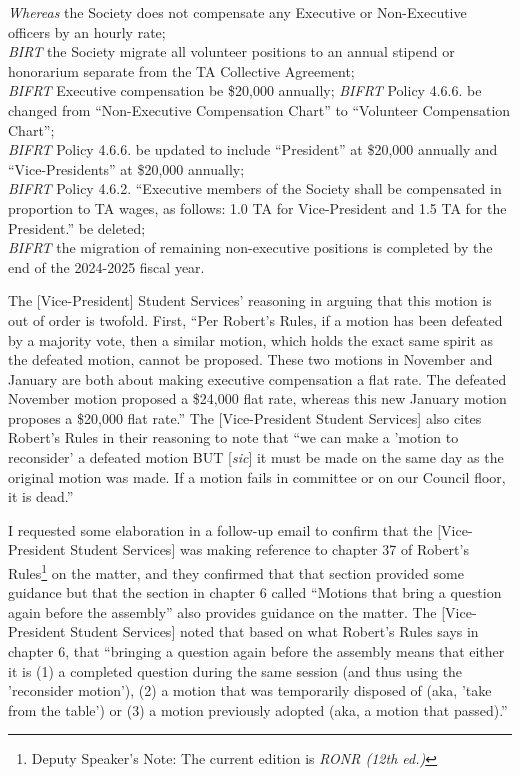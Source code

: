\begin{multicols}{2}
\begin{small}
\begin{center}
\begin{minipage}{0.8\linewidth}
				\emph{Whereas} the Society does not compensate any Executive or Non-Executive officers by an hourly rate;\\
				\emph{BIRT} the Society migrate all volunteer positions to an annual stipend or honorarium separate from the TA Collective Agreement;\\
				\emph{BIFRT} Executive compensation be \$20,000 annually;
				\emph{BIFRT} Policy 4.6.6. be changed from ``Non-Executive Compensation Chart'' to ``Volunteer Compensation Chart'';\\
				\emph{BIFRT} Policy 4.6.6. be updated to include ``President'' at \$20,000 annually and ``Vice-Presidents'' at \$20,000 annually;\\
				\emph{BIFRT} Policy 4.6.2. ``Executive members of the Society shall be compensated in proportion to TA wages, as follows: 1.0 TA for Vice-President and 1.5 TA for the President.'' be deleted;\\
				\emph{BIFRT} the migration of remaining non-executive positions is completed by the end of the 2024-2025 fiscal year.
			\end{minipage}
		\end{center}
	\end{small}

The [Vice-President] Student Services' reasoning in arguing that this motion is out of order is twofold. First, ``Per Robert's Rules, if a motion has been defeated by a majority vote, then a similar motion, which holds the exact same spirit as the defeated motion, cannot be proposed. These two motions \textemdash in November and January \textemdash are both about making executive compensation a flat rate. The defeated November motion proposed a \$24,000 flat rate, whereas this new January motion proposes a \$20,000 flat rate.'' The [Vice-President Student Services] also cites Robert's Rules in their reasoning to note that ``we can make a 'motion to reconsider' a defeated motion BUT [\emph{sic}] it must be made on the same day as the original motion was made. If a motion fails in committee or on our Council floor, it is dead.''

\indent I requested some elaboration in a follow-up email to confirm that the [Vice-President Student Services] was making reference to chapter 37 of Robert's Rules\footnote{Deputy Speaker's Note: The current edition is \emph{RONR (12th ed.)}} on the matter, and they confirmed that that section provided some guidance but that the section in chapter 6 called ``Motions that bring a question again before the assembly'' also provides guidance on the matter. The [Vice-President Student Services] noted that based on what Robert's Rules says in chapter 6, that ``bringing a question again before the assembly means that either it is (1) a completed question during the same session (and thus using the 'reconsider motion'), (2) a motion that was temporarily disposed of (aka, 'take from the table') or (3) a motion previously adopted (aka, a motion that passed).''


\end{multicols}
